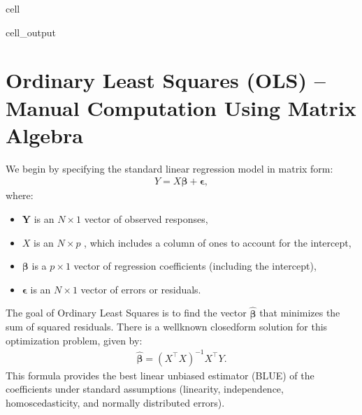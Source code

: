 \documentclass[letterpaper,10pt,english]{jupyterBook}
\begin{document}
\begin{sphinxuseclass}{cell}
\begin{sphinxVerbatimOutput}
\begin{sphinxuseclass}{cell_output}
\noindent{}

\end{sphinxuseclass}\end{sphinxVerbatimOutput}

\end{sphinxuseclass}

\section{Ordinary Least Squares (OLS) – Manual Computation Using Matrix Algebra}
\label{\detokenize{02:ordinary-least-squares-ols-manual-computation-using-matrix-algebra}}
\sphinxAtStartPar
We begin by specifying the standard linear regression model in matrix form:
\begin{equation*}
\begin{split}
Y = X \boldsymbol{\beta} + \boldsymbol{\epsilon},
\end{split}
\end{equation*}
\sphinxAtStartPar
where:
\begin{itemize}
\item {} 
\sphinxAtStartPar
\(\mathbf{Y}\) is an \(N \times 1\) vector of observed responses,

\item {} 
\sphinxAtStartPar
\(X\) is an \(N \times p\) , which includes a column of ones to account for the intercept,

\item {} 
\sphinxAtStartPar
\(\boldsymbol{\beta}\) is a \(p \times 1\) vector of regression coefficients (including the intercept),

\item {} 
\sphinxAtStartPar
\(\boldsymbol{\epsilon}\) is an \(N \times 1\) vector of errors or residuals.

\end{itemize}

\sphinxAtStartPar
The goal of Ordinary Least Squares is to find the vector \(\hat{\boldsymbol{\beta}}\) that minimizes the sum of squared residuals. There is a well\sphinxhyphen{}known closed\sphinxhyphen{}form solution for this optimization problem, given by:
\begin{equation*}
\begin{split}
\hat{\boldsymbol{\beta}} = (X^\top X)^{-1} X^\top Y.
\end{split}
\end{equation*}
\sphinxAtStartPar
This formula provides the best linear unbiased estimator (BLUE) of the coefficients under standard assumptions (linearity, independence, homoscedasticity, and normally distributed errors).
\end{document}
